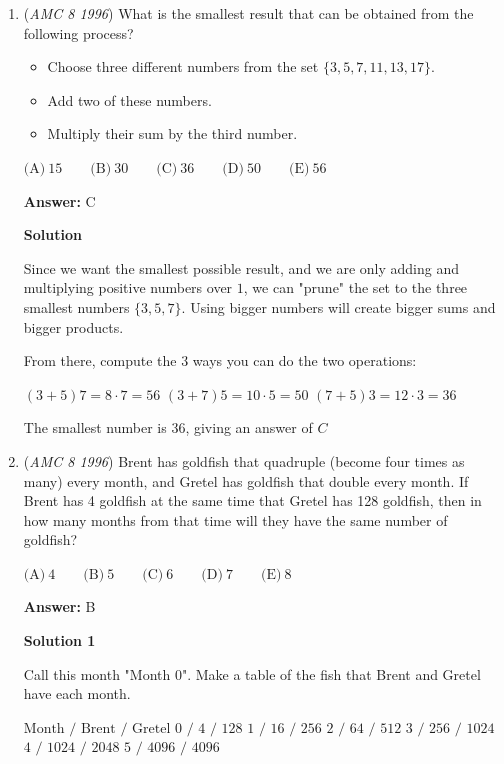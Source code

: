\begin{enumerate}
	\item (\textit{AMC 8 1996}) What is the smallest result that can be obtained from the following process?


 
            \begin{itemize}
        \item Choose three different numbers from the set $\{3,5,7,11,13,17\}$.

        \item Add two of these numbers.

        \item Multiply their sum by the third number.
            \end{itemize}
            $\text{(A)}\ 15 \qquad \text{(B)}\ 30 \qquad \text{(C)}\ 36 \qquad \text{(D)}\ 50 \qquad \text{(E)}\ 56$

 \textbf{Answer: }C



\textbf{Solution}

Since we want the smallest possible result, and we are only adding and multiplying positive numbers over $1$, we can "prune" the set to the three smallest numbers $\{3,5,7\}$.  Using bigger numbers will create bigger sums and bigger products.

 From there, compute the $3$ ways you can do the two operations:

 $(3+5)7 = 8\cdot 7 = 56$
$(3 + 7)5 = 10\cdot 5 = 50$
$(7+5)3 = 12\cdot 3 = 36$

 The smallest number is 36, giving an answer of $\boxed{C}$



	\item (\textit{AMC 8 1996}) Brent has goldfish that quadruple (become four times as many) every month, and Gretel has goldfish that double every month.  If Brent has 4 goldfish at the same time that Gretel has 128 goldfish, then in how many months from that time will they have the same number of goldfish?


 $\text{(A)}\ 4 \qquad \text{(B)}\ 5 \qquad \text{(C)}\ 6 \qquad \text{(D)}\ 7 \qquad \text{(E)}\ 8$

 \textbf{Answer: }B



\textbf{Solution 1}

Call this month "Month 0".  Make a table of the fish that Brent and Gretel have each month.

 $\text{Month / Brent / Gretel}$
$\text{0 / 4 / 128}$
$\text{1 / 16 / 256}$
$\text{2 / 64 / 512}$
$\text{3 / 256 / 1024}$
$\text{4 / 1024 / 2048}$
$\text{5 / 4096 / 4096}$


\end{enumerate}
